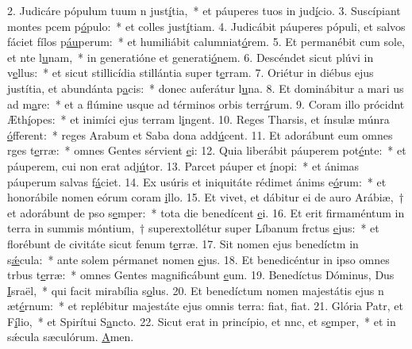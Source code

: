 2. Judicáre pópulum tuum n just\uline{í}tia,~* et páuperes tuos in jud\uline{í}cio.
3. Suscípiant montes pcem p\uline{ó}pulo:~* et colles just\uline{í}tiam.
4. Judicábit páuperes pópuli, et salvos fáciet fílos p\uline{áu}perum:~* et humiliábit calumniat\uline{ó}rem.
5. Et permanébit cum sole, et nte l\uline{u}nam,~* in generatióne et generati\uline{ó}nem.
6. Descéndet sicut plúvi in v\uline{e}llus:~* et sicut stillicídia stillántia super t\uline{e}rram.
7. Oriétur in diébus ejus justítia, et abundánta p\uline{a}cis:~* donec auferátur l\uline{u}na.
8. Et dominábitur a mari us ad m\uline{a}re:~* et a flúmine usque ad términos orbis terr\uline{á}rum.
9. Coram illo prócidnt Æth\uline{í}opes:~* et inimíci ejus terram l\uline{i}ngent.
10. Reges Tharsis, et ínsulæ múnra \uline{ó}fferent:~* reges Arabum et Saba dona add\uline{ú}cent.
11. Et adorábunt eum omnes rges t\uline{e}rræ:~* omnes Gentes sérvient \uline{e}i:
12. Quia liberábit páuperem  pot\uline{é}nte:~* et páuperem, cui non erat adj\uline{ú}tor.
13. Parcet páuper et \uline{í}nopi:~* et ánimas páuperum salvas f\uline{á}ciet.
14. Ex usúris et iniquitáte rédimet ánims e\uline{ó}rum:~* et honorábile nomen eórum coram \uline{i}llo.
15. Et vivet, et dábitur ei de auro Arábiæ,~† et adorábunt de pso s\uline{e}mper:~* tota die benedícent \uline{e}i.
16. Et erit firmaméntum in terra in summis móntium,~† superextollétur super Líbanum frctus \uline{e}jus:~* et florébunt de civitáte sicut fenum t\uline{e}rræ.
17. Sit nomen ejus benedíctm in s\uline{ǽ}cula:~* ante solem pérmanet nomen \uline{e}jus.
18. Et benedicéntur in ipso omnes trbus t\uline{e}rræ:~* omnes Gentes magnificábunt \uline{e}um.
19. Benedíctus Dóminus, Dus \uline{I}sraël,~* qui facit mirabília s\uline{o}lus.
20. Et benedíctum nomen majestátis ejus n æt\uline{é}rnum:~* et replébitur majestáte ejus omnis terra: fiat, f\uline{i}at.
21. Glória Patr, et F\uline{í}lio,~* et Spirítui S\uline{a}ncto.
22. Sicut erat in princípio, et nnc, et s\uline{e}mper,~* et in sǽcula sæculórum. \uline{A}men.
